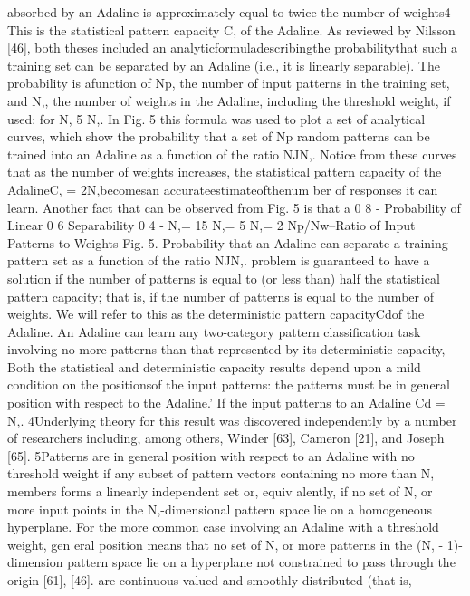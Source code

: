 \documentclass[11pt,a4paper,twocolumn]{article}
\begin{document}
absorbed by an Adaline is approximately equal to twice the 
number of weights4 This is the statistical pattern capacity 
C, of the Adaline. As reviewed by Nilsson [46], both theses 
included an analyticformuladescribingthe probabilitythat 
such a training set can be separated by an Adaline (i.e., it 
is linearly separable). The probability is afunction of Np, the 
number of input patterns in the training set, and N,, 
the 
number of weights in the Adaline, including the threshold 
weight, if used: 
for N, 
5 N,. 
In Fig. 5 this formula was used to plot a set of analytical 
curves, which show the probability that a set of Np random 
patterns can be trained into an Adaline as a function of the 
ratio NJN,. 
Notice from these curves that as the number 
of weights increases, the statistical pattern capacity of the 
AdalineC, = 2N,becomesan accurateestimateofthenum
ber of responses it can learn. 
Another fact that can be observed from Fig. 5 is that a 
0 8 -  
Probability 
of Linear 
0 6 
Separability 
0 4 -  
N,= 15 
N,= 5 
N,= 2 
Np/Nw--Ratio of Input Patterns to Weights 
Fig. 5. Probability that an Adaline can separate a training 
pattern set as a function of the ratio NJN,. 
problem is guaranteed to have a solution if the number of 
patterns is equal to (or less than) half the statistical pattern 
capacity; that is, if the number of patterns is equal to the 
number of weights. We will refer to this as the deterministic 
pattern capacityCdof the Adaline. An Adaline can learn any 
two-category pattern classification task involving no more 
patterns than that represented by its deterministic capacity, 
Both the statistical and deterministic capacity results 
depend upon a mild condition on the positionsof the input 
patterns: the patterns must be in general position with 
respect to the Adaline.’ If the input patterns to an Adaline 
Cd = N,. 
4Underlying theory for this result was discovered independently 
by a number of researchers including, among others, Winder [63], 
Cameron [21], 
and Joseph [65]. 
5Patterns are in general position with respect to an Adaline with 
no threshold weight if any subset of pattern vectors containing no 
more than N, members forms a linearly independent set or, equiv
alently, if no set of N, or more input points in the N,-dimensional 
pattern space lie on a homogeneous hyperplane. For the more 
common case involving an Adaline with a threshold weight, gen
eral position means that no set of N, or more patterns in the (N, 
- 1)-dimension pattern space lie on a hyperplane not constrained 
to pass through the origin [61], [46]. 
are continuous valued and smoothly distributed (that is, 
\end{document}
